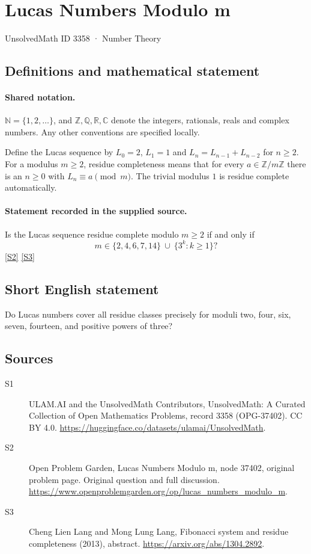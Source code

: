 \documentclass[11pt]{article}
\newcommand{\sref}[2]{\hyperlink{source:#1:#2}{[S#2]}}
\begin{document}
\setcounter{section}{3357}
\section{Lucas Numbers Modulo m}\label{3358}
{\small\sffamily UnsolvedMath ID 3358 · Number Theory}
\subsection{Definitions and mathematical statement}

\paragraph{Shared notation.}$\mathbb N=\{1,2,\ldots\}$, and $\mathbb Z,\mathbb Q,\mathbb R,\mathbb C$ denote the integers, rationals, reals and complex numbers. Any other conventions are specified locally.


Define the Lucas sequence by $L_0=2$, $L_1=1$ and $L_n=L_{n-1}+L_{n-2}$ for $n\geq2$. For a modulus $m\geq2$, residue completeness means that for every $a\in\mathbb Z/m\mathbb Z$ there is an $n\geq0$ with $L_n\equiv a\pmod m$. The trivial modulus $1$ is residue complete automatically.
\paragraph{Statement recorded in the supplied source.}
Is the Lucas sequence residue complete modulo $m\geq2$ if and only if\[ m\in\{2,4,6,7,14\}\ \cup\ \{3^k:k\geq1\}? \] \sref{3358}{2} \sref{3358}{3}
\subsection{Short English statement}
Do Lucas numbers cover all residue classes precisely for moduli two, four, six, seven, fourteen, and positive powers of three?
\subsection{Sources}
\begin{description}
\item[\hypertarget{source:3358:1}{S1}] ULAM.AI and the UnsolvedMath Contributors, UnsolvedMath: A Curated Collection of Open Mathematics Problems, record 3358 (OPG-37402). CC BY 4.0. \url{https://huggingface.co/datasets/ulamai/UnsolvedMath}.
\item[\hypertarget{source:3358:2}{S2}] Open Problem Garden, Lucas Numbers Modulo m, node 37402, original problem page. Original question and full discussion. \url{https://www.openproblemgarden.org/op/lucas_numbers_modulo_m}.
\item[\hypertarget{source:3358:3}{S3}] Cheng Lien Lang and Mong Lung Lang, Fibonacci system and residue completeness (2013), abstract. \url{https://arxiv.org/abs/1304.2892}.
\end{description}
\label{end:3358}
\end{document}
